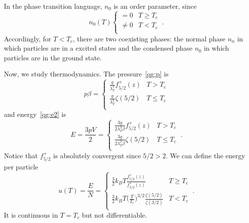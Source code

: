     In the phase transition language, $n_0$ is an order parameter, since 
    \begin{equation*}
        n_0 (T) \begin{cases}
            = 0 & T \geq T_c \\
            \neq 0 & T < T_c \\
        \end{cases} ~.
    \end{equation*}
    Accordingly, for $T < T_c$, there are two coexisting phases: the normal phase $n_n$ in which particles are in a excited states and the condensed phase $n_0$ in which particles are in the ground state.

    Now, we study thermodynamics. The pressure~\eqref{qg:p} is 
    \begin{equation*}
        p \beta = \begin{cases}
            \frac{g}{\lambda_T^3} f^+_{5/2} (z)  & T > T_c \\
            \frac{g}{\lambda_T^3} \zeta(5/2)  & T \leq T_c \\
        \end{cases}
    \end{equation*}
    and energy~\eqref{qg:e2} is
    \begin{equation}\label{eeee}
        E = \frac{3pV}{2} = \begin{cases}
            \frac{3 g}{2 \lambda_T^3 \beta} f^+_{5/2} (z) & T > T_c \\
            \frac{3 g}{2 \lambda_T^3 \beta} \zeta(5/2) & T \leq T_c \\
        \end{cases} ~.
    \end{equation} 
    Notice that $f^+_{5/2}$ is absolutely convergent since $5/2 > 2$. We can define the energy per particle 
    \begin{equation*}
        u(T) = \frac{E}{N} = \begin{cases}
            \frac{3}{2} k_B T \frac{f^+_{5/2} (z)}{f^+_{3/2} (z)} & T \geq T_c \\
            \frac{3}{2} k_B T \Big ( \frac{T}{T_c} \Big)^{3/2} \frac{\zeta(5/2)}{\zeta(3/2)} & T < T_c \\
        \end{cases} ~.
    \end{equation*}
    It is continuous in $T=T_c$ but not differentiable.
